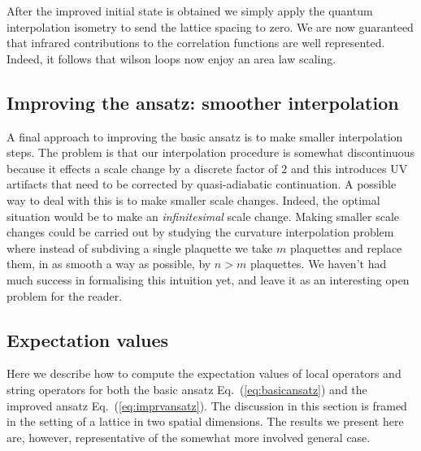 \documentclass[twocolumn,lengthcheck,superscriptaddress]{revtex4-1}
\theoremstyle{definition}
\theoremstyle{remark}
\begin{document}
After the improved initial state is obtained we simply apply the quantum interpolation isometry to send the lattice spacing to zero. We are now guaranteed that infrared contributions to the correlation functions are well represented. Indeed, it follows that wilson loops now enjoy an area law scaling. 

\subsection{Improving the ansatz: smoother interpolation}
A final approach to improving the basic ansatz is to make smaller interpolation steps. The problem is that our interpolation procedure is somewhat discontinuous because it effects a scale change by a discrete factor of $2$ and this introduces UV artifacts that need to be corrected by quasi-adiabatic continuation. A possible way to deal with this is to make smaller scale changes. Indeed, the optimal situation would be to make an \emph{infinitesimal} scale change. Making smaller scale changes could be carried out by studying the curvature interpolation problem where instead of subdiving a single plaquette we take $m$ plaquettes and replace them, in as smooth a way as possible, by $n>m$ plaquettes. We haven't had much success in formalising this intuition yet, and leave it as an interesting open problem for the reader.

\subsection{Expectation values}
Here we describe how to compute the expectation values of local operators and string operators for both the basic ansatz Eq.~(\ref{eq:basicansatz}) and the improved ansatz Eq.~(\ref{eq:imprvansatz}). The discussion in this section is framed in the setting of a lattice in two spatial dimensions. The results we present here are, however, representative of the somewhat more involved general case.
\end{document}
